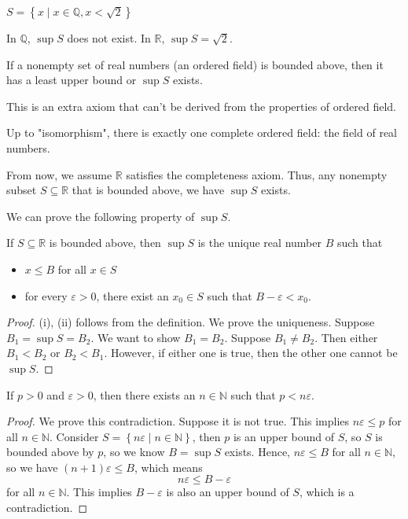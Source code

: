 \begin{eg}
  \(S = \left\{ x \mid x \in \mathbb{Q} , x < \sqrt{2}  \right\} \) 
\end{eg}

In \(\mathbb{Q} \), \(\sup S\) does not exist. In \(\mathbb{R} \), \(\sup S = \sqrt{2} \).    

\begin{theorem}
  If a nonempty set of real numbers (an ordered field) is bounded above, then it has a least upper bound or \(\sup S\) exists. 
\end{theorem}
\begin{remark}
  This is an extra axiom that can't be derived from the properties of ordered field. 
\end{remark}
\begin{remark}
  Up to "isomorphism", there is exactly one complete ordered field: the field of real numbers.
\end{remark}
\begin{remark}
  From now, we assume \(\mathbb{R} \) satisfies the completeness axiom. Thus, any nonempty subset \(S \subseteq \mathbb{R} \) that is bounded above, we have \(\sup S\) exists.   
\end{remark}
We can prove the following property of \(\sup S\).
\begin{theorem}
  If \(S \subseteq \mathbb{R} \) is bounded above, then \(\sup S\) is the unique real number \(B\) such that 
  \begin{itemize}
    \item [(i)] \(x \le B\) for all \(x \in S\)
    \item [(ii)] for every \(\varepsilon > 0\), there exist an \(x_0 \in S\) such that \(B - \varepsilon < x_0\).     
  \end{itemize}   
\end{theorem} 
\begin{proof}
  (i), (ii) follows from the definition. We prove the uniqueness. Suppose \(B_1 = \sup S = B_2\). We want to show \(B_1 = B_2\). Suppose \(B_1 \neq B_2\). Then either \(B_1 < B_2\) or \(B_2 < B_1\). However, if either one is true, then the other one cannot be \(\sup S\).      
\end{proof}
\begin{theorem}\label{thm: Archimedean property}
  If \(p > 0\) and \(\varepsilon > 0\), then there exists an \(n \in \mathbb{N} \) such that \(p < n \varepsilon \).    
\end{theorem}
\begin{proof}
  We prove this contradiction. Suppose it is not true. This implies \(n \varepsilon \le p\) for all \(n \in \mathbb{N} \). Consider \(S = \left\{ n \varepsilon \mid n \in \mathbb{N}  \right\} \), then \(p\) is an upper bound of \(S\), so \(S\) is bounded above by \(p\), so we know \(B = \sup S\) exists. Hence, \(n \varepsilon \le B\) for all \(n \in \mathbb{N} \), so we have \((n+1)\varepsilon \le B\), which means
  \[
    n \varepsilon \le B - \varepsilon 
  \]   for all \(n \in \mathbb{N} \). This implies \(B - \varepsilon \) is also an upper bound of \(S\), which is a contradiction.   
\end{proof}
